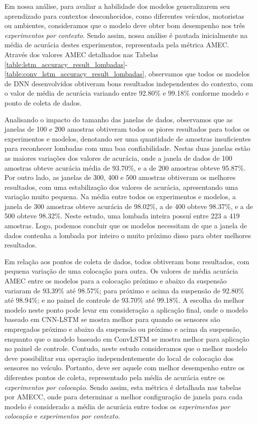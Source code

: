 Em nossa análise, para avaliar a habilidade dos modelos generalizarem seu aprendizado para contextos desconhecidos, como diferentes veículos, motoristas ou ambientes, consideramos que o modelo deve obter bom desempenho nos três \emph{experimentos por contexto}. Sendo assim, nossa análise é pautada inicialmente na média de acurácia destes experimentos, representada pela métrica AMEC. Através dos valores AMEC detalhados nas Tabelas \ref{table:lstm_accuracy_result_lombadas}-\ref{table:conv_lstm_accuracy_result_lombadas}, observamos que todos os modelos de DNN desenvolvidos obtiveram bons resultados independentes do contexto, com o valor de média de acurácia variando entre 92.80\% e 99.18\% conforme modelo e ponto de coleta de dados.

Analisando o impacto do tamanho das janelas de dados, observamos que as janelas de 100 e 200 amostras obtiveram todos os piores resultados para todos os experimentos e modelos, denotando ser uma quantidade de amostras insuficientes para reconhecer lombadas com uma boa confiabilidade. Nestas duas janelas estão as maiores variações dos valores de acurácia, onde a janela de dados de 100 amostras obteve acurácia média de 93.70\%, e a de 200 amostras obteve 95.87\%. Por outro lado, as janelas de 300, 400 e 500 amostras obtiveram os melhores resultados, com uma estabilização dos valores de acurácia, apresentando uma variação muito pequena. Na média entre todos os experimentos e modelos, a janela de 300 amostras obteve acurácia de 98.02\%, a de 400 obteve 98.37\%, e a de 500 obteve 98.32\%. Neste estudo, uma lombada inteira possuí entre 223 a 419 amostras. Logo, podemos concluir que os modelos necessitam de que a janela de dados contenha a lombada por inteiro o muito próximo disso para obter melhores resultados.

Em relação aos pontos de coleta de dados, todos obtiveram bons resultados, com pequena variação de uma colocação para outra. Os valores de média acurácia AMEC entre os modelos para a colocação próximo e abaixo da suspensão variaram de 93.39\% até 98.57\%; para próximo e acima da suspensão de 92.80\% até 98.94\%; e no painel de controle de 93.70\% até 99.18\%. A escolha do melhor modelo neste ponto pode levar em consideração a aplicação final, onde o modelo baseado em CNN-LSTM se mostra melhor para quando os sensores são empregados próximo e abaixo da suspensão ou próximo e acima da suspensão, enquanto que o modelo baseado em ConvLSTM se mostra melhor para aplicação no painel de controle. Contudo, neste estudo consideramos que o melhor modelo deve possibilitar sua operação independentemente do local de colocação dos sensores no veículo. Portanto, deve ser aquele com melhor desempenho entre os diferentes pontos de coleta, representado pela média de acurácia entre os \emph{experimentos por colocação}. Sendo assim, esta métrica é detalhada nas tabelas por AMECC, onde para determinar a melhor configuração de janela para cada modelo é considerado a média de acurácia entre todos os \emph{experimentos por colocação} e \emph{experimentos por contexto}.

